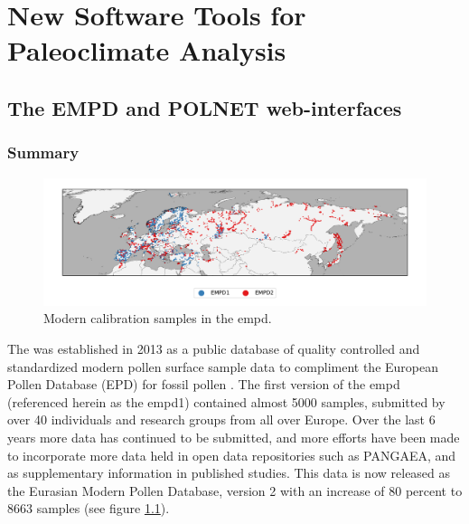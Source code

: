 \documentclass[
11pt, %
english, %
singlespacing, %
headsepline, %
]{MastersDoctoralThesis} %
\begin{document}
\begin{NoHyper}
\begin{refsection}
\printbibliography[heading=subbibintoc]

\end{refsection}


\part{New Software Tools for Paleoclimate Analysis}  \label{part:software}


\chapter{The EMPD and POLNET web-interfaces}

\label{chp:empd}

\begin{refsection}

\section{Summary}\label{sec:empd-summary}

\begin{figure}
	\includegraphics[width=\linewidth]{empd-figures/empd-sites.pdf}
	\caption[Modern calibration samples in the EMPD]{Modern calibration samples in the \gls{empd}.}
	\label{fig:empd-sites}
\end{figure}

The  was established in 2013 as a public database of quality controlled and standardized modern pollen surface sample data to compliment the European Pollen Database (EPD) for fossil pollen \citep{DavisZanonCollinsEtAl2013}. The first version of the \gls{empd} (referenced herein as the \gls{empd}1) contained almost 5000 samples, submitted by over 40 individuals and research groups from all over Europe. Over the last 6 years more data has continued to be submitted, and more efforts have been made to incorporate more data held in open data repositories such as PANGAEA, and as supplementary information in published studies. This data is now released as the Eurasian Modern Pollen Database, version 2 \citep{DavisChevalierSommerEtAlinprep} with an increase of 80 percent to 8663 samples (see figure \ref{fig:empd-sites}).


\end{refsection}
\end{NoHyper}
\end{document}
